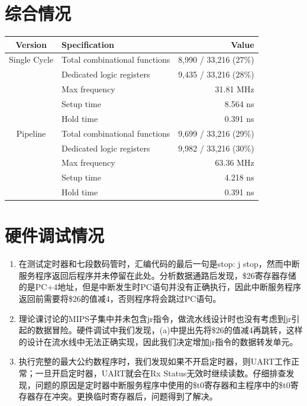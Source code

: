 \documentclass{article}
\begin{document}
    \section{综合情况}
        \begin{table}[H]
            \centering
            \begin{tabular}{c|lr}
              \toprule
              Version & Specification & Value \\
              \midrule
              Single Cycle  & Total combinational functions & 8,990 / 33,216 (27\%) \\
                            & Dedicated logic registers & 9,435 / 33,216 (28\%) \\
                            & Max frequency & 31.81 MHz \\
                            & Setup time & 8.564 ns \\
                            & Hold time & 0.391 ns \\
              \midrule
              Pipeline  & Total combinational functions & 9,699 / 33,216 (29\%) \\
                        & Dedicated logic registers & 9,982 / 33,216 (30\%) \\
                        & Max frequency & 63.36 MHz \\
                        & Setup time & 4.218 ns \\
                        & Hold time & 0.391 ns \\
              \bottomrule
            \end{tabular}
        \end{table}


    \section{硬件调试情况}
        \begin{enumerate}
          \item 在测试定时器和七段数码管时，汇编代码的最后一句是stop: j stop，然而中断服务程序返回后程序并未停留在此处。分析数据通路后发现，\$26寄存器存储的是PC+4地址，但是中断发生时PC语句并没有正确执行，因此中断服务程序返回前需要将\$26的值减4，否则程序将会跳过PC语句。
          \item 理论课讨论的MIPS子集中并未包含jr指令，做流水线设计时也没有考虑到jr引起的数据冒险。硬件调试中我们发现，(a)中提出先将\$26的值减4再跳转，这样的设计在流水线中无法正确实现，因此我们决定增加jr指令的数据转发单元。
          \item 执行完整的最大公约数程序时，我们发现如果不开启定时器，则UART工作正常；一旦开启定时器，UART就会在Rx Status无效时继续读数。仔细排查发现，问题的原因是定时器中断服务程序中使用的\$t0寄存器和主程序中的\$t0寄存器存在冲突。更换临时寄存器后，问题得到了解决。
        \end{enumerate}
\end{document}
